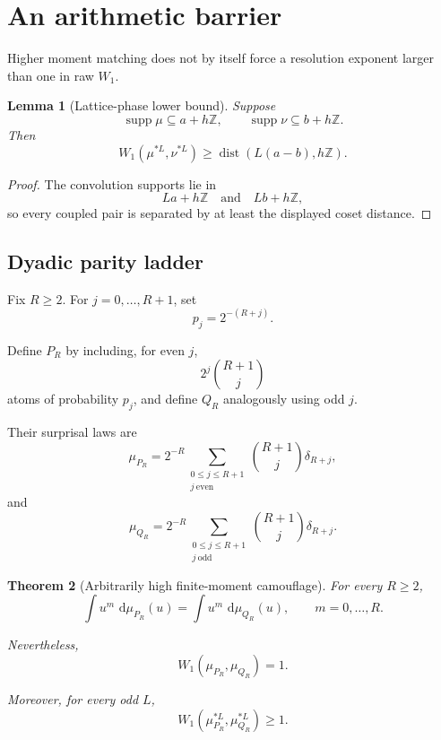 \documentclass[11pt,a4paper]{article}
\newtheorem{theorem}{Theorem}[section]
\newtheorem{lemma}[theorem]{Lemma}
\newcommand{\supp}{\operatorname{supp}}
\newcommand{\1}{\mathbf 1}
\newcommand{\dd}{\,\mathrm d}
\begin{document}
\section{An arithmetic barrier}

Higher moment matching does not by itself force a resolution exponent
larger than one in raw \(W_1\).

\begin{lemma}[Lattice-phase lower bound]
Suppose
\[
\supp\mu\subseteq a+h\mathbb Z,
\qquad
\supp\nu\subseteq b+h\mathbb Z.
\]
Then
\[
\boxed{
W_1(\mu^{*L},\nu^{*L})
\ge
\operatorname{dist}
(L(a-b),h\mathbb Z).
}
\tag{26.1}
\]
\end{lemma}

\begin{proof}
The convolution supports lie in
\[
La+h\mathbb Z
\quad\text{and}\quad
Lb+h\mathbb Z,
\]
so every coupled pair is separated by at least the displayed coset
distance.
\end{proof}


\subsection{Dyadic parity ladder}

Fix \(R\ge2\).
For \(j=0,\ldots,R+1\), set
\[
p_j=2^{-(R+j)}.
\]

Define \(P_R\) by including, for even \(j\),
\[
2^j\binom{R+1}{j}
\]
atoms of probability \(p_j\), and define \(Q_R\) analogously using odd
\(j\).

Their surprisal laws are
\[
\mu_{P_R}
=
2^{-R}
\sum_{\substack{0\le j\le R+1\\j\ \mathrm{even}}}
\binom{R+1}{j}
\delta_{R+j},
\tag{26.2}
\]
and
\[
\mu_{Q_R}
=
2^{-R}
\sum_{\substack{0\le j\le R+1\\j\ \mathrm{odd}}}
\binom{R+1}{j}
\delta_{R+j}.
\tag{26.3}
\]

\begin{theorem}[Arbitrarily high finite-moment camouflage]
For every \(R\ge2\),
\[
\boxed{
\int u^m\,\dd\mu_{P_R}(u)
=
\int u^m\,\dd\mu_{Q_R}(u),
\qquad
m=0,\ldots,R.
}
\tag{26.4}
\]

Nevertheless,
\[
\boxed{
W_1(\mu_{P_R},\mu_{Q_R})=1.
}
\tag{26.5}
\]

Moreover, for every odd \(L\),
\[
\boxed{
W_1(\mu_{P_R}^{*L},\mu_{Q_R}^{*L})\ge1.
}
\tag{26.6}
\]
\end{theorem}
\end{document}
